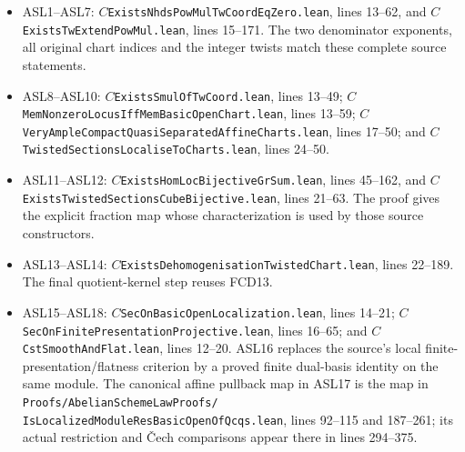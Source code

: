 \documentclass[11pt,a4paper]{article}
\numberwithin{equation}{section}
\theoremstyle{remark}\newtheorem{remark}[theorem]{Remark}
\begin{document}
\begin{itemize}
\item ASL1--ASL7:
$C$\texttt{Exists\allowbreak{}Nhds\allowbreak{}Pow\allowbreak{}Mul\allowbreak{}Tw\allowbreak{}Coord\allowbreak{}Eq\allowbreak{}Zero.lean},
lines 13--62, and
$C$\texttt{Exists\allowbreak{}Tw\allowbreak{}Extend\allowbreak{}Pow\allowbreak{}Mul.lean}, lines 15--171.
The two denominator exponents, all original chart indices
and the integer twists match these complete source statements.
\item ASL8--ASL10:
$C$\texttt{Exists\allowbreak{}Smul\allowbreak{}Of\allowbreak{}Tw\allowbreak{}Coord.lean}, lines 13--49;
$C$\texttt{Mem\allowbreak{}Nonzero\allowbreak{}Locus\allowbreak{}Iff\allowbreak{}Mem\allowbreak{}Basic\allowbreak{}Open\allowbreak{}Chart.lean},
lines 13--59;
$C$\texttt{Very\allowbreak{}Ample\allowbreak{}Compact\allowbreak{}Quasi\allowbreak{}Separated\allowbreak{}Affine\allowbreak{}Charts.lean},
lines 17--50; and
$C$\texttt{Twisted\allowbreak{}Sections\allowbreak{}Localise\allowbreak{}To\allowbreak{}Charts.lean}, lines 24--50.
\item ASL11--ASL12:
$C$\texttt{Exists\allowbreak{}Hom\allowbreak{}Loc\allowbreak{}Bijective\allowbreak{}Gr\allowbreak{}Sum.lean}, lines 45--162,
and $C$\texttt{Exists\allowbreak{}Twisted\allowbreak{}Sections\allowbreak{}Cube\allowbreak{}Bijective.lean},
lines 21--63.  The proof gives the explicit fraction map
whose characterization is used by those source constructors.
\item ASL13--ASL14:
$C$\texttt{Exists\allowbreak{}Dehomogenisation\allowbreak{}Twisted\allowbreak{}Chart.lean},
lines 22--189.  The final quotient-kernel step reuses FCD13.
\item ASL15--ASL18:
$C$\texttt{Sec\allowbreak{}On\allowbreak{}Basic\allowbreak{}Open\allowbreak{}Localization.lean}, lines 14--21;
$C$\texttt{Sec\allowbreak{}On\allowbreak{}Finite\allowbreak{}Presentation\allowbreak{}Projective.lean},
lines 16--65; and $C$\texttt{Cst\allowbreak{}Smooth\allowbreak{}And\allowbreak{}Flat.lean},
lines 12--20.  ASL16 replaces the source's local
finite-presentation/flatness criterion by a proved finite
dual-basis identity on the same module.
The canonical affine pullback map in ASL17 is the map in
\texttt{Proofs/\allowbreak{}Abelian\allowbreak{}Scheme\allowbreak{}Law\allowbreak{}Proofs/\allowbreak{}}
\texttt{Is\allowbreak{}Localized\allowbreak{}Module\allowbreak{}Res\allowbreak{}Basic\allowbreak{}Open\allowbreak{}Of\allowbreak{}Qcqs.lean},
lines 92--115 and 187--261; its actual restriction and
\v Cech comparisons appear there in lines 294--375.

\end{itemize}
\end{document}
